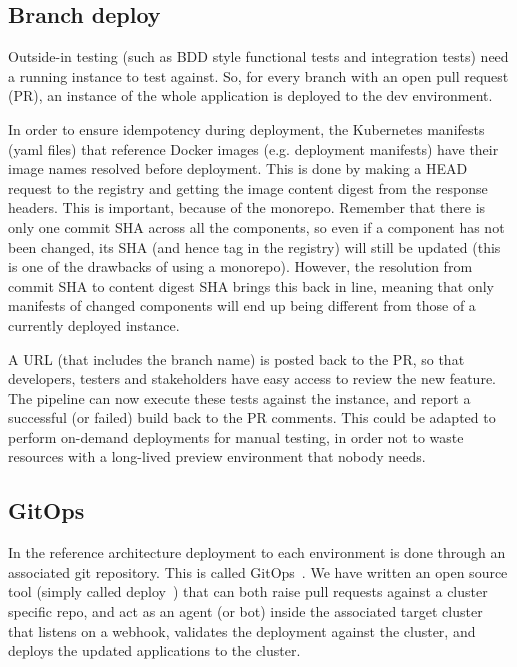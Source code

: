 \documentclass[reprint,amsmath,amssymb,aps]{revtex4-1}
\begin{document}
\subsection{\label{sec:branchdeploy}Branch deploy}

Outside-in testing (such as BDD style functional tests and integration tests) need a running instance to test against. So, for every branch with an open pull request (PR), an instance of the whole application is deployed to the dev environment.

In order to ensure idempotency during deployment, the Kubernetes manifests (yaml files) that reference Docker images (e.g. deployment manifests) have their image names resolved before deployment. This is done by making a HEAD request to the registry and getting the image content digest from the response headers. This is important, because of the monorepo. Remember that there is only one commit SHA across all the components, so even if a component has not been changed, its SHA (and hence tag in the registry) will still be updated (this is one of the drawbacks of using a monorepo). However, the resolution from commit SHA to content digest SHA brings this back in line, meaning that only manifests of changed components will end up being different from those of a currently deployed instance.

A URL (that includes the branch name) is posted back to the PR, so that developers, testers and stakeholders have easy access to review the new feature. The pipeline can now execute these tests against the instance, and report a successful (or failed) build back to the PR comments. This could be adapted to perform on-demand deployments for manual testing, in order not to waste resources with a long-lived preview environment that nobody needs.

\subsection{\label{sec:gitops}GitOps}

In the reference architecture deployment to each environment is done through an associated git repository. This is called GitOps~\cite{GitOpsPa62:online}. We have written an open source tool (simply called deploy~\cite{redbadge45:online}) that can both raise pull requests against a cluster specific repo, and act as an agent (or bot) inside the associated target cluster that listens on a webhook, validates the deployment against the cluster, and deploys the updated applications to the cluster.
\end{document}
